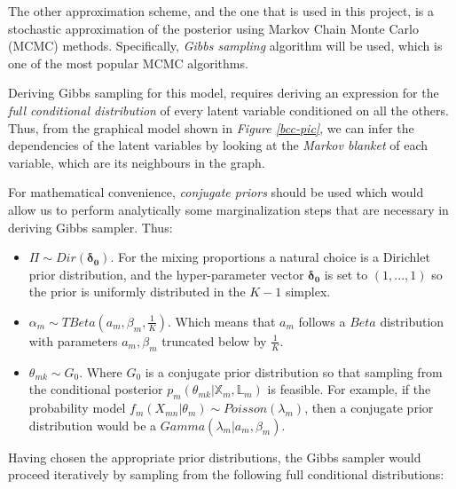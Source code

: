 The other approximation scheme, and the one that is used in this project, is a stochastic approximation of the posterior using Markov Chain Monte Carlo (MCMC) methods. Specifically, \emph{Gibbs sampling} algorithm will be used, which is one of the most popular MCMC algorithms. 

Deriving Gibbs sampling for this model, requires deriving an expression for the \emph{full conditional distribution} of every latent variable conditioned on all the others. Thus, from the graphical model shown in \emph{Figure \ref{bcc-pic}}, we can infer the dependencies of the latent variables by looking at the \emph{Markov blanket} of each variable, which are its neighbours in the graph. 

For mathematical convenience, \emph{conjugate priors} should be used which would allow us to perform analytically some marginalization steps that are necessary in deriving Gibbs sampler. Thus:

\begin{itemize}
	\item $\Pi \sim Dir(\mathbf{\delta_{0}})$. For the mixing proportions a natural choice is a Dirichlet prior distribution, and the hyper-parameter vector $\mathbf{\delta_{0}}$ is set to $(1,...,1)$ so the prior is uniformly distributed in the $K-1$ simplex.
	\item $\alpha_{m} \sim TBeta(\mathit{a_{m}}, \beta_{m}, \frac{1}{K})$. Which means that $a_{m}$ follows a  $Beta$ distribution with parameters $\mathit{a_{m}}, \beta_{m}$ truncated below by $\frac{1}{K}$.
	\item $\theta_{mk} \sim G_{0}$. Where $G_{0}$ is a conjugate prior distribution so that sampling from the conditional posterior $p_{m}(\theta_{mk}|\mathbb{X}_{m}, \mathbb{L}_{m})$ is feasible. For example, if the probability model $f_{m}(X_{mn}|\theta_{m}) \sim Poisson(\lambda_{m})$, then a conjugate prior distribution would be a $Gamma(\lambda_{m}|\mathit{a_{m}}, \beta_{m})$.
\end{itemize}

Having chosen the appropriate prior distributions, the Gibbs sampler would proceed iteratively by sampling from the following full conditional distributions:


